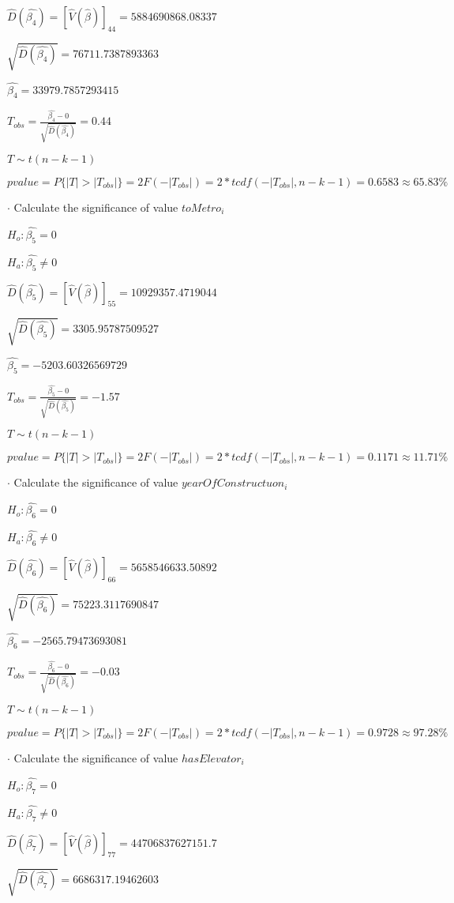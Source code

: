 \documentclass{article}
\begin{document}
$\hat{D}(\hat{\beta_4})=[\hat{V}(\hat{\beta})]_{4 4}=5884690868.08337$

$\sqrt{\hat{D}(\hat{\beta_4})}=76711.7387893363$

$\hat{\beta_4}=33979.7857293415$

$T_{obs}=\frac{\hat{\beta_4}-0}{\sqrt{\hat{D}(\hat{\beta_4})}}=0.44$

$T\sim t(n-k-1)$

$pvalue=P\{|T|>|T_{obs}|\}=2F(-|T_{obs}|)=2*tcdf(-|T_{obs}|, n-k-1)=0.6583\approx65.83\%$

$\cdot$ Calculate the significance of value $toMetro_i$

$H_o: \hat{\beta_5}=0$

$H_a: \hat{\beta_5}\neq0$

$\hat{D}(\hat{\beta_5})=[\hat{V}(\hat{\beta})]_{5 5}=10929357.4719044$

$\sqrt{\hat{D}(\hat{\beta_5})}=3305.95787509527$

$\hat{\beta_5}=-5203.60326569729$

$T_{obs}=\frac{\hat{\beta_5}-0}{\sqrt{\hat{D}(\hat{\beta_5})}}=-1.57$

$T\sim t(n-k-1)$

$pvalue=P\{|T|>|T_{obs}|\}=2F(-|T_{obs}|)=2*tcdf(-|T_{obs}|, n-k-1)=0.1171\approx11.71\%$

$\cdot$ Calculate the significance of value $yearOfConstructuon_i$

$H_o: \hat{\beta_6}=0$

$H_a: \hat{\beta_6}\neq0$

$\hat{D}(\hat{\beta_6})=[\hat{V}(\hat{\beta})]_{6 6}=5658546633.50892$

$\sqrt{\hat{D}(\hat{\beta_6})}=75223.3117690847$

$\hat{\beta_6}=-2565.79473693081$

$T_{obs}=\frac{\hat{\beta_6}-0}{\sqrt{\hat{D}(\hat{\beta_6})}}=-0.03$

$T\sim t(n-k-1)$

$pvalue=P\{|T|>|T_{obs}|\}=2F(-|T_{obs}|)=2*tcdf(-|T_{obs}|, n-k-1)=0.9728\approx97.28\%$

$\cdot$ Calculate the significance of value $hasElevator_i$

$H_o: \hat{\beta_7}=0$

$H_a: \hat{\beta_7}\neq0$

$\hat{D}(\hat{\beta_7})=[\hat{V}(\hat{\beta})]_{7 7}=44706837627151.7$

$\sqrt{\hat{D}(\hat{\beta_7})}=6686317.19462603$
\end{document}
